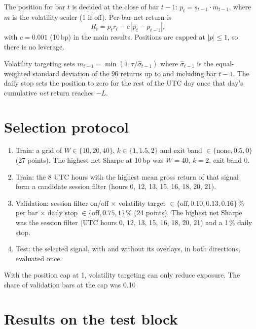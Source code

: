 \documentclass[11pt,a4paper]{article}
\begin{document}
The position for bar $t$ is decided at the close of bar $t-1$:
$p_t = s_{t-1}\cdot m_{t-1}$, where $m$ is the volatility scaler (1 if
off). Per-bar net return is
\begin{equation}
  R_t = p_t r_t - c\,|p_t - p_{t-1}|,
\end{equation}
with $c = 0.001$ (10\,bp) in the main results. Positions are
capped at $|p|\le 1$, so there is no leverage.

Volatility targeting sets $m_{t-1} = \min(1, \tau/\hat\sigma_{t-1})$ where
$\hat\sigma_{t-1}$ is the equal-weighted standard deviation of the
96 returns up to and including bar $t-1$. The daily stop sets
the position to zero for the rest of the UTC day once that day's cumulative
\emph{net} return reaches $-L$.

\section{Selection protocol}

\begin{enumerate}
  \item Train: a grid of $W\in\{10,20,40\}$, $k\in\{1,1.5,2\}$ and exit band
        $\in\{\text{none},0.5,0\}$ (27 points). The highest net Sharpe at 10\,bp
        was $W=40$, $k=2$, exit band 0.
  \item Train: the 8 UTC hours with the highest mean gross
        return of that signal form a candidate session filter (hours 0, 12, 13, 15, 16, 18, 20, 21).
  \item Validation: session filter on/off $\times$ volatility target
        $\in\{\text{off}, 0.10, 0.13, 0.16\}\,\%$ per bar $\times$ daily stop
        $\in\{\text{off}, 0.75, 1\}\,\%$ (24 points). The highest net Sharpe was
        the session filter (UTC hours 0, 12, 13, 15, 16, 18, 20, 21) and a 1\,\% daily stop.
  \item Test: the selected signal, with and without its overlays, in both
        directions, evaluated once.
\end{enumerate}

With the position cap at 1, volatility targeting can only reduce exposure. The
share of validation bars at the cap was 0.10\,\\%

\section{Results on the test block}
\end{document}
